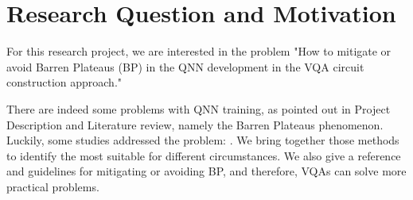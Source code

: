 \section{Research Question and Motivation}
For this research project, we are interested in the problem "How to mitigate or avoid Barren Plateaus (BP) in the QNN development in the VQA circuit construction approach."

There are indeed some problems with QNN training, as pointed out in Project Description and Literature review, namely the Barren Plateaus phenomenon.
Luckily, some studies addressed the problem: \cite{pesahAbsenceBarrenPlateaus2021,pattiEntanglementDevisedBarren2021,liuParameterInitializationMethod2021}.
We bring together those methods to identify the most suitable for different circumstances.
We also give a reference and guidelines for mitigating or avoiding BP, and therefore, VQAs can solve more practical problems. 
